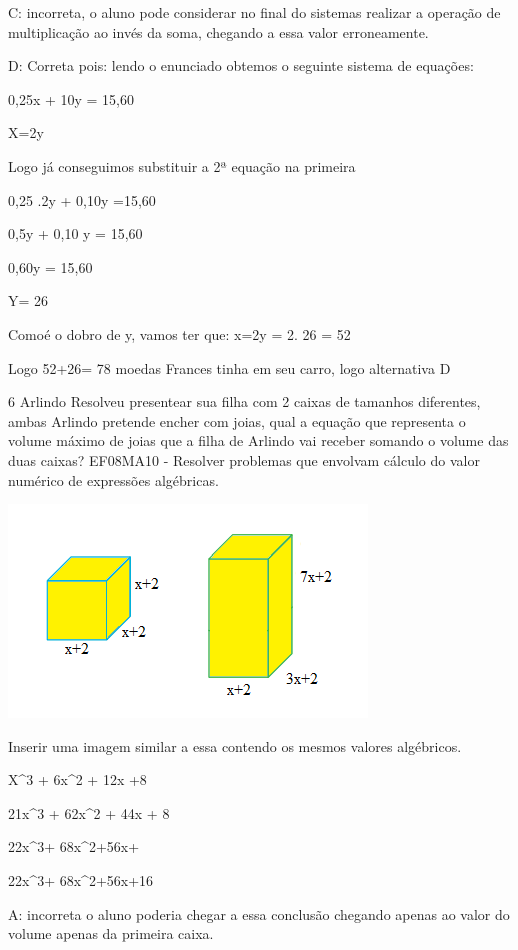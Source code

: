 C: incorreta, o aluno pode considerar no final do sistemas realizar a
operação de multiplicação ao invés da soma, chegando a essa valor
erroneamente.

D: Correta pois: lendo o enunciado obtemos o seguinte sistema de
equações:

0,25x + 10y = 15,60

X=2y

Logo já conseguimos substituir a 2ª equação na primeira

0,25 .2y + 0,10y =15,60

0,5y + 0,10 y = 15,60

0,60y = 15,60

Y= 26

Como\times é o dobro de y, vamos ter que: x=2y = 2. 26 = 52

Logo 52+26= 78 moedas Frances tinha em seu carro, logo alternativa D

\num{6} Arlindo Resolveu presentear sua filha com 2 caixas de tamanhos
diferentes, ambas Arlindo pretende encher com joias, qual a equação que
representa o volume máximo de joias que a filha de Arlindo vai receber
somando o volume das duas caixas? EF08MA10 - Resolver problemas que
envolvam cálculo do valor numérico de expressões algébricas.

\includegraphics[width=2\times 63333in,height=1\times 56545in]{./imgSAEB_8_MAT/media/image55.png}

Inserir uma imagem similar a essa contendo os mesmos valores algébricos.

\item X^3 + 6x^2 + 12x +8
\item 21x^3 + 62x^2 + 44x + 8
\item 22x^3+ 68x^2+56x+
\item 22x^3+ 68x^2+56x+16

A: incorreta o aluno poderia chegar a essa conclusão chegando apenas ao
valor do volume apenas da primeira caixa.

